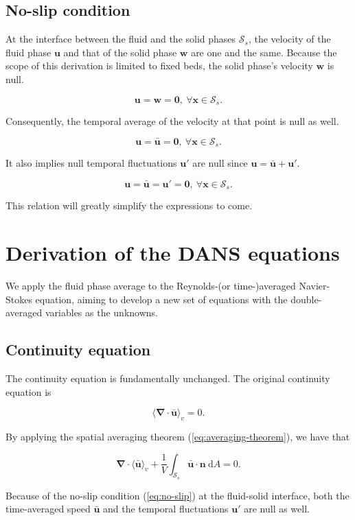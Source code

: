 \documentclass[a4paper,11pt]{article}
\begin{document}
\subsection{No-slip condition}

At the interface between the fluid and the solid phases $\mathcal S_s$, the velocity of the fluid phase $\bm u$ and that of the solid phase $\bm w$ are one and the same. Because the scope of this derivation is limited to fixed beds, the solid phase's velocity $\bm w$ is null.

$$\bm u = \bm w = \bm 0,\ \forall\bm x\in\mathcal S_s.$$

Consequently, the temporal average of the velocity at that point is null as well.

$$\bm u = \bm{\bar u} = \bm 0,\ \forall\bm x\in\mathcal S_s.$$

It also implies null temporal fluctuations $\bm u'$ are null since $\bm u=\bm{\bar u}+\bm u'$.

\begin{equation}\label{eq:no-slip}
  \bm u = \bm{\bar u} = \bm u' = \bm 0,\ \forall\bm x\in\mathcal S_s.
\end{equation}

This relation will greatly simplify the expressions to come.

\section{Derivation of the DANS equations}

We apply the fluid phase average to the Reynolds-(or time-)averaged Navier-Stokes equation, aiming to develop a new set of equations with the double-averaged variables as the unknowns.

\subsection{Continuity equation}

The continuity equation is fundamentally unchanged. The original continuity equation is

$$\langle\bm\nabla\cdot\bm{\bar u}\rangle_v = 0.$$

By applying the spatial averaging theorem (\autoref{eq:averaging-theorem}), we have that

$$\bm\nabla\cdot\langle\bm{\bar u}\rangle_v + \frac{1}{V}\int_{\mathcal S_s}{\bm{\bar u}\cdot \bm n}~\mathrm dA = 0.$$

Because of the no-slip condition (\autoref{eq:no-slip}) at the fluid-solid interface, both the time-averaged speed ${\bm{\bar u}}$ and the temporal fluctuations ${\bm u'}$ are null as well.
\end{document}
